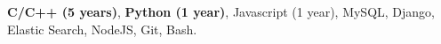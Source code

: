 
\begin{cvempty}


\begin{cvitems} %
  \item {\textbf{C/C++ (5 years)}, \textbf{Python (1 year)}, Javascript (1 year), MySQL, Django, Elastic Search, NodeJS, Git, Bash.}
\end{cvitems}

\end{cvempty}
